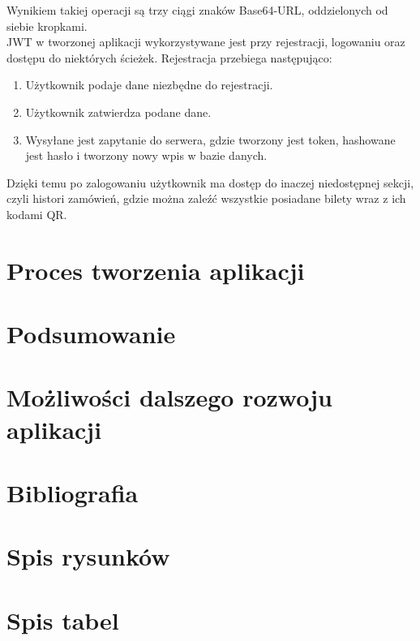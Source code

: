 \documentclass[12pt]{article}
\begin{document}
\begin{sloppypar}
{{\begin{figure}[H]
      \label{fig:jwt_signature}
    \end{figure}
    Wynikiem takiej operacji są trzy ciągi znaków Base64-URL, oddzielonych od siebie kropkami.\\
    JWT w tworzonej aplikacji wykorzystywane jest przy rejestracji, logowaniu oraz dostępu do niektórych ścieżek. 
    Rejestracja przebiega następująco:
    \begin{enumerate}
      \item Użytkownik podaje dane niezbędne do rejestracji.
      \item Użytkownik zatwierdza podane dane.
      \item Wysyłane jest zapytanie do serwera, gdzie tworzony jest token, hashowane jest hasło i tworzony nowy wpis w bazie danych.
    \end{enumerate}
    Dzięki temu po zalogowaniu użytkownik ma dostęp do inaczej niedostępnej sekcji, czyli histori zamówień, gdzie można zaleźć wszystkie posiadane bilety wraz z ich kodami QR.
  }
}

\section{Proces tworzenia aplikacji}
{

}

\section{Podsumowanie}
{

}

\section{Możliwości dalszego rozwoju aplikacji}
{

}

\section{Bibliografia}
{
  \printbibliography
}

\section{Spis rysunków}
{
  \listoffigures
}

\section{Spis tabel}
{
  \listoftables
}

\end{sloppypar}
\end{document}
